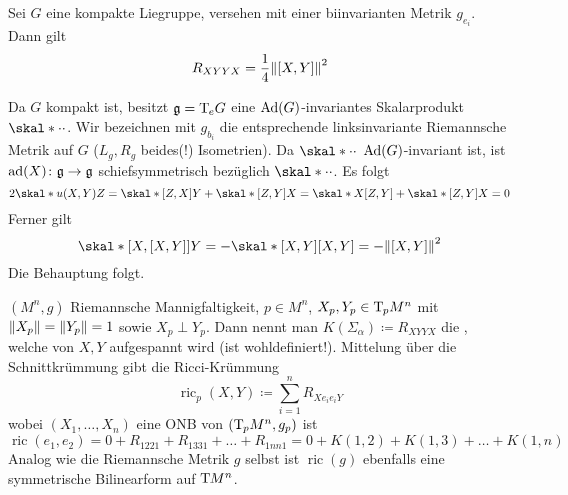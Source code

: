 \begin{korollar}
	Sei $G$ eine kompakte Liegruppe, versehen mit einer biinvarianten Metrik $g_{e_i}$.
	Dann gilt
	\[
		R_{XYYX} = \frac{1}{4} \norm*{\benbrace*{X,Y}}^2 
	\]
\end{korollar}
\begin{beweis}
	Da $G$ kompakt ist, besitzt $\mathfrak{g} = \Tmap_e G$ eine $\Ad(G)$-invariantes Skalarprodukt $\skal*{\cdot }{\cdot }$.
	Wir bezeichnen mit $g_{b_i}$ die entsprechende linksinvariante Riemannsche Metrik auf $G$ ($L_g,R_g$ beides(!) Isometrien).
	Da $\skal*{\cdot}{\cdot }$ $\Ad(G)$-invariant ist, ist $\ad(X) \colon \mathfrak{g} \to \mathfrak{g}$ schiefsymmetrisch bezüglich $\skal*{\cdot}{\cdot}$.
	Es folgt 
	\[
		2\skal*{u(X,Y)}{Z} = \skal*{ \benbrace*{Z,X}}{Y} + \skal*{\benbrace*{Z,Y}}{X} = \skal*{X}{\benbrace*{Z,Y}} + \skal*{\benbrace*{Z,Y}}{X} =0
	\]
	Ferner gilt 
	\[
		\skal*{\benbrace*{X,\benbrace*{X,Y}}}{Y} = - \skal*{\benbrace*{X,Y}}{\benbrace*{X,Y}} = - \norm*{\benbrace*{X,Y}}^2
	\]
	Die Behauptung folgt.
\end{beweis}

\begin{erinnerung}
	$(M^n,g)$ Riemannsche Mannigfaltigkeit, $p \in M^n$, $X_p,Y_p \in \Tmap_p M^n$ mit $\norm*{X_p} = \norm*{Y_p} = 1$ sowie $X_p \perp Y_p$.
	Dann nennt man $K(\Sigma_\alpha) \coloneqq R_{XYYX}$ die , welche von $X,Y$ aufgespannt wird (ist wohldefiniert!).
	Mittelung über die Schnittkrümmung gibt die Ricci-Krümmung
	\[
		\operatorname{ric}_p(X,Y) \coloneqq \sum_{i=1}^{n} R_{Xe_i e_i Y}
	\]
	wobei $(X_1, \ldots ,X_n)$ eine ONB von $\enbrace*{\Tmap_p M^n,g_p}$ ist
	\[
		\operatorname{ric}(e_1,e_2) = 0 + R_{1221} + R_{1331} + \ldots + R_{1nn1} = 0 + K(1,2) + K(1,3) + \ldots + K(1,n)
	\]
	Analog wie die Riemannsche Metrik $g$ selbst ist $\operatorname{ric}(g)$ ebenfalls eine symmetrische Bilinearform auf $\Tmap M^n$.
\end{erinnerung}

